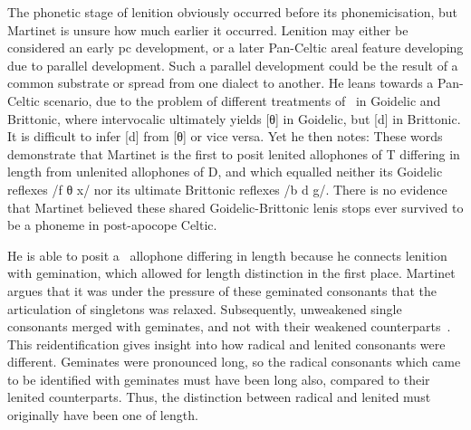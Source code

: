 The phonetic stage of lenition obviously occurred before its phonemicisation, but Martinet is unsure how much earlier it occurred. Lenition may either be considered an early \acrlong{pc} development, or a later Pan-Celtic areal feature developing due to parallel development. Such a parallel development could be the result of a common substrate or spread from one dialect to another. He leans towards a Pan-Celtic scenario, due to the problem of different treatments of \lT\ in Goidelic and Brittonic, where intervocalic  ultimately yields [θ] in Goidelic, but [d] in Brittonic. It is difficult to infer [d] from [θ] or vice versa. Yet he then notes:
These words demonstrate that Martinet is the first to posit lenited allophones of \gls{T} differing in length from unlenited allophones of \gls{D}, and which equalled neither its Goidelic reflexes /f θ x/ nor its ultimate Brittonic reflexes /b d g/. There is no evidence that Martinet believed these shared Goidelic-Brittonic lenis stops ever survived to be a phoneme in post-apocope Celtic.

He is able to posit a \lT\ allophone differing in length because he connects lenition with gemination, which allowed for length distinction in the first place. Martinet argues that it was under the pressure of these geminated consonants  that the articulation of singletons was relaxed. Subsequently, unweakened single consonants merged with geminates, and not with their weakened counterparts~\autocite[212]{martinet_celtic_1952}. This reidentification gives insight into how radical and lenited consonants were different. Geminates were pronounced long, so the radical consonants which came to be identified with geminates must have been long also, compared to their lenited counterparts. Thus, the distinction between radical and lenited must originally have been one of length.


